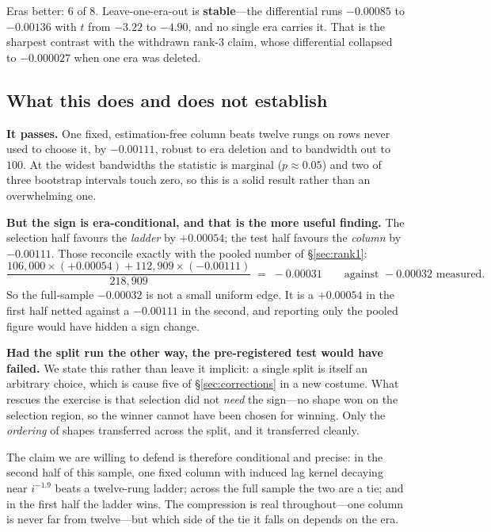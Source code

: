 \documentclass[11pt,a4paper]{article}
\begin{document}
\noindent
Eras better: 6 of 8. Leave-one-era-out is \textbf{stable}---the differential
runs $-0.00085$ to $-0.00136$ with $t$ from $-3.22$ to $-4.90$, and no single
era carries it. That is the sharpest contrast with the withdrawn rank-3 claim,
whose differential collapsed to $-0.000027$ when one era was deleted.

\subsection{What this does and does not establish}

\textbf{It passes.} One fixed, estimation-free column beats twelve rungs on
rows never used to choose it, by $-0.00111$, robust to era deletion and to
bandwidth out to $100$. At the widest bandwidths the statistic is marginal
($p \approx 0.05$) and two of three bootstrap intervals touch zero, so this is
a solid result rather than an overwhelming one.

\textbf{But the sign is era-conditional, and that is the more useful finding.}
The selection half favours the \emph{ladder} by $+0.00054$; the test half
favours the \emph{column} by $-0.00111$. Those reconcile exactly with the
pooled number of \S\ref{sec:rank1}:
\[
  \frac{106{,}000 \times (+0.00054) + 112{,}909 \times (-0.00111)}{218{,}909}
  \;=\; -0.00031
  \qquad\text{against } -0.00032 \text{ measured.}
\]
So the full-sample $-0.00032$ is not a small uniform edge. It is a
$+0.00054$ in the first half netted against a $-0.00111$ in the second, and
reporting only the pooled figure would have hidden a sign change.

\textbf{Had the split run the other way, the pre-registered test would have
failed.} We state this rather than leave it implicit: a single split is itself
an arbitrary choice, which is cause five of \S\ref{sec:corrections} in a new
costume. What rescues the exercise is that selection did not \emph{need} the
sign---no shape won on the selection region, so the winner cannot have been
chosen for winning. Only the \emph{ordering} of shapes transferred across the
split, and it transferred cleanly.

The claim we are willing to defend is therefore conditional and precise: in the
second half of this sample, one fixed column with induced lag kernel decaying
near $i^{-1.9}$ beats a twelve-rung ladder; across the full sample the two are
a tie; and in the first half the ladder wins. The compression is real
throughout---one column is never far from twelve---but which side of the tie it
falls on depends on the era.
\end{document}
